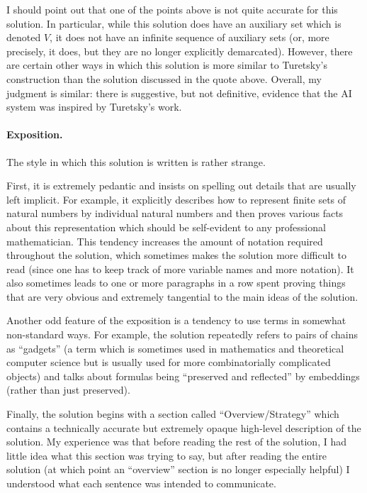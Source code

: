 \documentclass[12pt]{article}
\theoremstyle{definition}
\theoremstyle{remark}
\begin{document}
I should point out that one of the points above is not quite accurate for this solution. In particular, while this solution does have an auxiliary set which is denoted $V$, it does not have an infinite sequence of auxiliary sets (or, more precisely, it does, but they are no longer explicitly demarcated). However, there are certain other ways in which this solution is more similar to Turetsky's construction than the solution discussed in the quote above. Overall, my judgment is similar: there is suggestive, but not definitive, evidence that the AI system was inspired by Turetsky's work.

\paragraph{Exposition.}
The style in which this solution is written is rather strange. 

First, it is extremely pedantic and insists on spelling out details that are usually left implicit. For example, it explicitly describes how to represent finite sets of natural numbers by individual natural numbers and then proves various facts about this representation which should be self-evident to any professional mathematician. This tendency increases the amount of notation required throughout the solution, which sometimes makes the solution more difficult to read (since one has to keep track of more variable names and more notation). It also sometimes leads to one or more paragraphs in a row spent proving things that are very obvious and extremely tangential to the main ideas of the solution.

Another odd feature of the exposition is a tendency to use terms in somewhat non-standard ways. For example, the solution repeatedly refers to pairs of chains as ``gadgets'' (a term which is sometimes used in mathematics and theoretical computer science but is usually used for more combinatorially complicated objects) and talks about formulas being ``preserved and reflected'' by embeddings (rather than just preserved).

Finally, the solution begins with a section called ``Overview/Strategy'' which contains a technically accurate but extremely opaque high-level description of the solution. My experience was that before reading the rest of the solution, I had little idea what this section was trying to say, but after reading the entire solution (at which point an ``overview'' section is no longer especially helpful) I understood what each sentence was intended to communicate.
\end{document}
